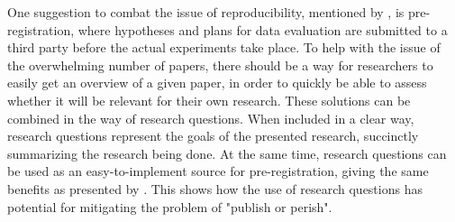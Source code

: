 One suggestion to combat the issue of reproducibility, mentioned by \textcite{Baker_2016}, is pre-registration, where hypotheses and plans for data evaluation are submitted to a third party before the actual experiments take place. To help with the issue of the overwhelming number of papers, there should be a way for researchers to easily get an overview of a given paper, in order to quickly be able to assess whether it will be relevant for their own research. These solutions can be combined in the way of research questions. When included in a clear way, research questions represent the goals of the presented research, succinctly summarizing the research being done. At the same time, research questions can be used as an easy-to-implement source for pre-registration, giving the same benefits as presented by \textcite{Baker_2016}. This shows how the use of research questions has potential for mitigating the problem of "publish or perish".


